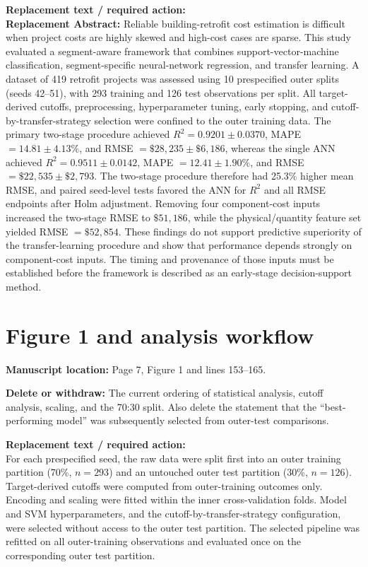 \documentclass[10pt]{article}
\newcommand{\loc}[1]{\textbf{Manuscript location:} #1}
\newcommand{\replacewith}[1]{\textbf{Replacement text / required action:}\\{\color{revisionblue}#1}}
\newcommand{\deleteitem}[1]{\textbf{Delete or withdraw:} {\color{deleteRed}#1}}
\begin{document}
\replacewith{\textbf{Replacement Abstract:} Reliable building-retrofit cost estimation is difficult when project costs are highly skewed and high-cost cases are sparse. This study evaluated a segment-aware framework that combines support-vector-machine classification, segment-specific neural-network regression, and transfer learning. A dataset of 419 retrofit projects was assessed using 10 prespecified outer splits (seeds 42--51), with 293 training and 126 test observations per split. All target-derived cutoffs, preprocessing, hyperparameter tuning, early stopping, and cutoff-by-transfer-strategy selection were confined to the outer training data. The primary two-stage procedure achieved $R^2=0.9201\pm0.0370$, MAPE $=14.81\pm4.13\%$, and RMSE $=\$28{,}235\pm\$6{,}186$, whereas the single ANN achieved $R^2=0.9511\pm0.0142$, MAPE $=12.41\pm1.90\%$, and RMSE $=\$22{,}535\pm\$2{,}793$. The two-stage procedure therefore had 25.3\% higher mean RMSE, and paired seed-level tests favored the ANN for $R^2$ and all RMSE endpoints after Holm adjustment. Removing four component-cost inputs increased the two-stage RMSE to $\$51{,}186$, while the physical/quantity feature set yielded RMSE $=\$52{,}854$. These findings do not support predictive superiority of the transfer-learning procedure and show that performance depends strongly on component-cost inputs. The timing and provenance of those inputs must be established before the framework is described as an early-stage decision-support method.}

\section{Figure 1 and analysis workflow}

\loc{Page 7, Figure 1 and lines 153--165.}

\deleteitem{The current ordering of statistical analysis, cutoff analysis, scaling, and the 70:30 split. Also delete the statement that the ``best-performing model'' was subsequently selected from outer-test comparisons.}

\replacewith{For each prespecified seed, the raw data were split first into an outer training partition (70\%, $n=293$) and an untouched outer test partition (30\%, $n=126$). Target-derived cutoffs were computed from outer-training outcomes only. Encoding and scaling were fitted within the inner cross-validation folds. Model and SVM hyperparameters, and the cutoff-by-transfer-strategy configuration, were selected without access to the outer test partition. The selected pipeline was refitted on all outer-training observations and evaluated once on the corresponding outer test partition.}
\end{document}
